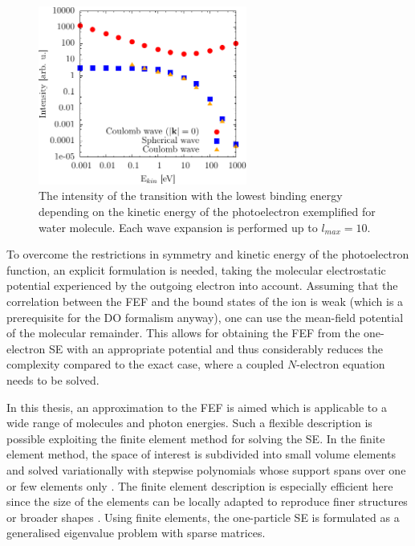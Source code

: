 \begin{figure}
   \includegraphics[width=0.61\textwidth]{Figures/water1}
   \caption{The intensity of the transition with the lowest binding energy depending on the kinetic energy of the photoelectron exemplified for water molecule. Each wave expansion is performed up to $l_{max}=10$.} 
   \label{fig:Ekin}
\end{figure}
To overcome the restrictions in symmetry and kinetic energy of the photoelectron function, an explicit formulation is needed, taking the molecular electrostatic potential experienced by the outgoing electron into account.
Assuming that the correlation between the FEF and the bound states of the ion is weak (which is a prerequisite for the DO formalism anyway), one can use the mean-field potential of the molecular remainder.
This allows for obtaining the FEF from the one-electron SE with an appropriate potential and thus considerably reduces the complexity compared to the exact case, where a coupled $N$-electron equation needs to be solved.

In this thesis, an approximation to the FEF is aimed which is applicable to a wide range of molecules and photon energies.
Such a flexible description is possible exploiting the finite element method for solving the SE.
In the finite element method, the space of interest is subdivided into small volume elements and solved variationally with stepwise polynomials whose support spans over one or few elements only \cite{femBraess,femGilbarg}.
The finite element description is especially efficient here since the size of the elements can be locally adapted to reproduce finer structures or broader shapes \cite{femBraess,femCiarlet}.
Using finite elements, the one-particle SE is formulated as a generalised eigenvalue problem with sparse matrices.

